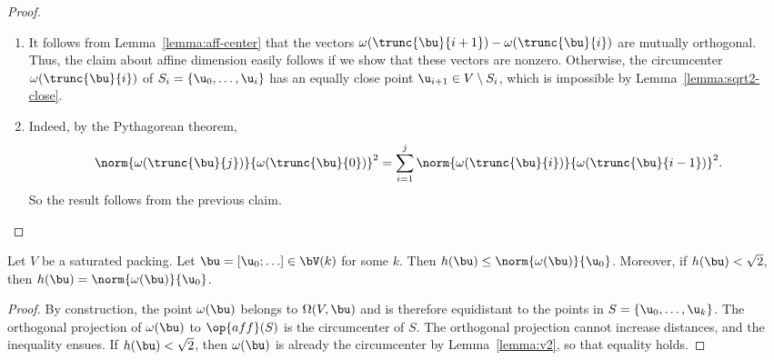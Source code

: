 \begin{proof}
\begin{enumerate}
\item{}
  It follows from Lemma~\ref{lemma:aff-center} that the vectors
  ${\omega(\trunc{\bu}{i+1})}-{\omega(\trunc{\bu}{i})}$ are mutually
  orthogonal.  Thus, the claim about affine dimension easily follows
  if we show that these vectors are nonzero.
Otherwise, the
circumcenter $\omega(\trunc{\bu}{i})$ of $S_i=\{\u_0,\ldots,\u_i\}$
has an equally close point $ \u_{i+1}\in V\setminus S_i$, which is
impossible by Lemma~\ref{lemma:sqrt2-close}.

\item{}  
Indeed, by the Pythagorean theorem,
\begin{equation} 
\norm{\omega(\trunc{\bu}{j})}{\omega(\trunc{\bu}{0})}^2 =
\sum_{i=1}^{j} \norm{\omega(\trunc{\bu}{i})}{\omega(\trunc{\bu}{i-1})}^2.
\end{equation}
So the result follows from the
previous claim.
\end{enumerate}
\end{proof}



\begin{lemma}
  Let $V$ be a saturated packing.  Let $\bu =[\u_0;\ldots]\in
  \bV(k)$ for some $k$.  Then $h(\bu)\le
  \norm{\omega(\bu)}{\u_0}$.  Moreover, if $h(\bu)<\sqrt2$, then
  $h(\bu)=\norm{\omega(\bu)}{\u_0}$.
\end{lemma}

\begin{proof} By construction, the point $\omega(\bu)$ belongs to
  $\Omega(V,\bu)$ and is therefore equidistant to the points in
  $S=\{\u_0,\ldots,\u_k\}$.  The orthogonal projection of
  $\omega(\bu)$ to $\op{aff}(S)$ is the circumcenter of $S$.  The
  orthogonal projection cannot increase distances, and the inequality
  ensues.  If $h(\bu)<\sqrt2$, then $\omega(\bu)$ is already the
  circumcenter by Lemma~\ref{lemma:v2}, so that equality holds.
\end{proof}

